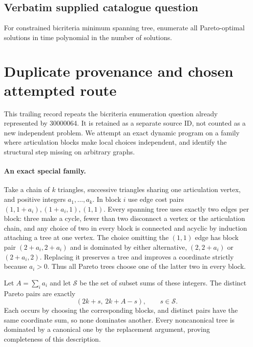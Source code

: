 \documentclass[11pt]{article}
\begin{document}
\subsection{Verbatim supplied catalogue question}
For constrained bicriteria minimum spanning tree, enumerate all Pareto-optimal solutions in time polynomial in the number of solutions.

\section{Duplicate provenance and chosen attempted route}
This trailing record repeats the bicriteria enumeration question
already represented by 30000064. It is retained as a separate
source ID, not counted as a new independent problem. We attempt
an exact dynamic program on a family where articulation blocks
make local choices independent, and identify the structural step
missing on arbitrary graphs.

\paragraph{An exact special family.}
Take a chain of $k$ triangles, successive triangles sharing one
articulation vertex, and positive integers $a_1,\ldots,a_k$.
In block $i$ use edge cost pairs
$(1,1+a_i),(1+a_i,1),(1,1)$.
Every spanning tree uses exactly two edges per block: three make
a cycle, fewer than two disconnect a vertex or the articulation
chain, and any choice of two in every block is connected and
acyclic by induction attaching a tree at one vertex.
The choice omitting the $(1,1)$ edge has block pair
$(2+a_i,2+a_i)$ and is dominated by either alternative,
$(2,2+a_i)$ or $(2+a_i,2)$. Replacing it preserves a tree
and improves a coordinate strictly because $a_i>0$.
Thus all Pareto trees choose one of the latter two in every block.

Let $A=\sum_i a_i$ and let $\mathcal S$ be the set of
subset sums of these integers. The distinct Pareto pairs are exactly
\[
(2k+s,\ 2k+A-s),\qquad s\in\mathcal S.
\]
Each occurs by choosing the corresponding blocks, and distinct
pairs have the same coordinate sum, so none dominates another.
Every noncanonical tree is dominated by a canonical one by the
replacement argument, proving completeness of this description.
\end{document}
